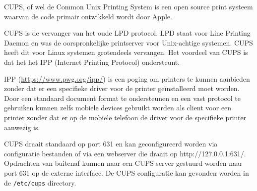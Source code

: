 CUPS, of wel de Common Unix Printing System is een open source print systeem waarvan de code primair ontwikkeld wordt door Apple.

CUPS is de vervanger van het oude LPD protocol. LPD staat voor Line Printing Daemon en was de oorspronkelijke printserver voor Unix-achtige systemen. CUPS heeft dit voor Linux systemen grotendeels vervangen. Het voordeel van CUPS is dat het het IPP (Internet Printing Protocol) ondersteunt.

IPP (\url{https://www.pwg.org/ipp/}) is een poging om printers te kunnen aanbieden zonder dat er een specifieke driver voor de printer ge\"installeerd moet worden. Door een standaard document format te ondersteunen en een vast protocol te gebruiken kunnen zelfs mobiele devices gebruikt worden als client voor een printer zonder dat er op de mobiele telefoon de driver voor de specifieke printer aanwezig is.

CUPS draait standaard op port 631 en kan geconfigureerd worden via configuratie bestanden of via een webserver die draait op http://127.0.0.1:631/. Opdrachten van buitenaf kunnen naar een CUPS server gestuurd worden naar port 631 op de externe interface. De CUPS configuratie kan gevonden worden in de \texttt{/etc/cups} directory.

